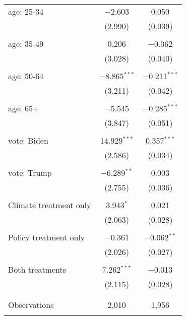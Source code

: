 \begin{tabular}{@{\extracolsep{5pt}}lcc}
 age: 25-34 & $-$2.603 & 0.050 \\ 
  & (2.990) & (0.039) \\ 
  & & \\ 
 age: 35-49 & 0.206 & $-$0.062 \\ 
  & (3.028) & (0.040) \\ 
  & & \\ 
 age: 50-64 & $-$8.865$^{***}$ & $-$0.211$^{***}$ \\ 
  & (3.211) & (0.042) \\ 
  & & \\ 
 age: 65+ & $-$5.545 & $-$0.285$^{***}$ \\ 
  & (3.847) & (0.051) \\ 
  & & \\ 
 vote: Biden & 14.929$^{***}$ & 0.357$^{***}$ \\ 
  & (2.586) & (0.034) \\ 
  & & \\ 
 vote: Trump & $-$6.289$^{**}$ & 0.003 \\ 
  & (2.755) & (0.036) \\ 
  & & \\ 
 Climate treatment only & 3.943$^{*}$ & 0.021 \\ 
  & (2.063) & (0.028) \\ 
  & & \\ 
 Policy treatment only & $-$0.361 & $-$0.062$^{**}$ \\ 
  & (2.026) & (0.027) \\ 
  & & \\ 
 Both treatments & 7.262$^{***}$ & $-$0.013 \\ 
  & (2.115) & (0.028) \\ 
  & & \\ 
\hline \\[-1.8ex] 

Observations & 2,010 & 1,956 \\ 
\hline 
\hline \\[-1.8ex] 
\end{tabular} 